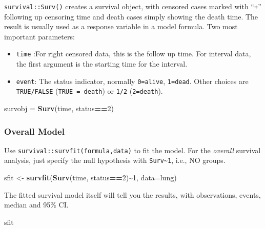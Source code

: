\documentclass[
]{ctexart}
\newenvironment{Shaded}{\begin{snugshade}}{\end{snugshade}}
\newcommand{\AttributeTok}[1]{\textcolor[rgb]{0.13,0.29,0.53}{#1}}
\newcommand{\DecValTok}[1]{\textcolor[rgb]{0.00,0.00,0.81}{#1}}
\newcommand{\FunctionTok}[1]{\textcolor[rgb]{0.13,0.29,0.53}{\textbf{#1}}}
\newcommand{\NormalTok}[1]{#1}
\newcommand{\OtherTok}[1]{\textcolor[rgb]{0.56,0.35,0.01}{#1}}
\newcommand{\SpecialCharTok}[1]{\textcolor[rgb]{0.81,0.36,0.00}{\textbf{#1}}}
\providecommand{\tightlist}{%
  \setlength{\itemsep}{0pt}\setlength{\parskip}{0pt}}
\begin{document}
\texttt{survival::Surv()} creates a survival object, with censored cases
marked with ``\texttt{+}'' following up censoring time and death cases
simply showing the death time. The result is usually used as a response
variable in a model formula. Two most important parameters:

\begin{itemize}
\tightlist
\item
  \texttt{time} :For right censored data, this is the follow up time.
  For interval data, the first argument is the starting time for the
  interval.
\item
  \texttt{event}: The status indicator, normally \texttt{0=alive},
  \texttt{1=dead}. Other choices are \texttt{TRUE/FALSE}
  (\texttt{TRUE\ =\ death}) or \texttt{1/2} (\texttt{2=death}).
\end{itemize}

\begin{Shaded}
\begin{Highlighting}[]
\NormalTok{survobj }\OtherTok{=} \FunctionTok{Surv}\NormalTok{(time, status}\SpecialCharTok{==}\DecValTok{2}\NormalTok{)}
\end{Highlighting}
\end{Shaded}

\hypertarget{overall-model-1}{%
\subsubsection{Overall Model}\label{overall-model-1}}

Use \texttt{survival::survfit(formula,data)} to fit the model. For the
\emph{overall} survival analysis, just specify the null hypothesis with
\texttt{Surv\textasciitilde{}1}, i.e., NO groups.

\begin{Shaded}
\begin{Highlighting}[]
\NormalTok{sfit }\OtherTok{\textless{}{-}} \FunctionTok{survfit}\NormalTok{(}\FunctionTok{Surv}\NormalTok{(time, status}\SpecialCharTok{==}\DecValTok{2}\NormalTok{)}\SpecialCharTok{\textasciitilde{}}\DecValTok{1}\NormalTok{, }\AttributeTok{data=}\NormalTok{lung)}
\end{Highlighting}
\end{Shaded}

The fitted survival model itself will tell you the results, with
observations, events, median and 95\% CI.

\begin{Shaded}
\begin{Highlighting}[]
\NormalTok{sfit}
\end{Highlighting}
\end{Shaded}
\end{document}
